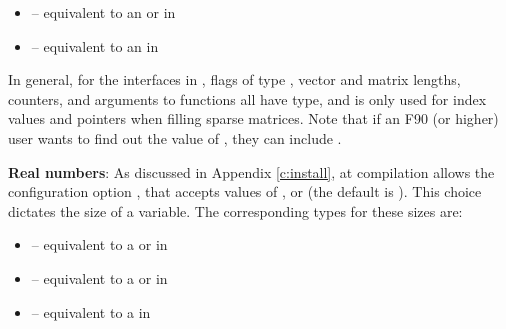 \begin{itemize}
\item {} 
 -- equivalent to an  or  in {\F}

\item {} 
 -- equivalent to an  in {\F}
\end{itemize}
In general, for the {\F} interfaces in {\sundials}, flags of type ,
vector and matrix lengths, counters, and arguments to  functions
all have  type, and  
is only used for index values and pointers when filling sparse matrices.
Note that if an F90 (or higher) user wants to find out the value of ,
they can include .


\textbf{Real numbers}:  As discussed in Appendix \ref{c:install}, at compilation
{\sundials} allows the configuration option ,
that accepts values of ,  or  (the
default is ).  This choice dictates the size of a
 variable.  The corresponding {\F} types for these
 sizes are:
\begin{itemize}
\item {} 
 -- equivalent to a  or  in {\F}

\item {} 
 -- equivalent to a  or  in {\F}

\item {} 
 -- equivalent to a  in {\F}

\end{itemize}

